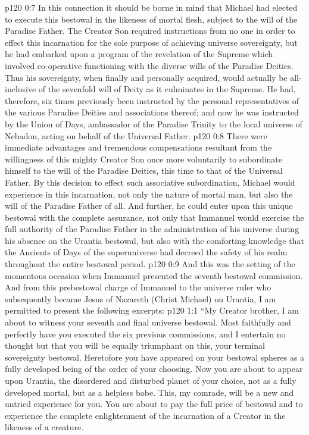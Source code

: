 \pc \vs p120 0:7 In this connection it should be borne in mind that Michael had elected to execute this bestowal in the likeness of mortal flesh, subject to the will of the Paradise Father. The Creator Son required instructions from no one in order to effect this incarnation for the sole purpose of achieving universe sovereignty, but he had embarked upon a program of the revelation of the Supreme which involved co\hyp{}operative functioning with the diverse wills of the Paradise Deities. Thus his sovereignty, when finally and personally acquired, would actually be all\hyp{}inclusive of the sevenfold will of Deity as it culminates in the Supreme. He had, therefore, six times previously been instructed by the personal representatives of the various Paradise Deities and associations thereof; and now he was instructed by the Union of Days, ambassador of the Paradise Trinity to the local universe of Nebadon, acting on behalf of the Universal Father.
\pc \vs p120 0:8 There were immediate advantages and tremendous compensations resultant from the willingness of this mighty Creator Son once more voluntarily to subordinate himself to the will of the Paradise Deities, this time to that of the Universal Father. By this decision to effect such associative subordination, Michael would experience in this incarnation, not only the nature of mortal man, but also the will of the Paradise Father of all. And further, he could enter upon this unique bestowal with the complete assurance, not only that Immanuel would exercise the full authority of the Paradise Father in the administration of his universe during his absence on the Urantia bestowal, but also with the comforting knowledge that the Ancients of Days of the superuniverse had decreed the safety of his realm throughout the entire bestowal period.
\pc \vs p120 0:9 And this was the setting of the momentous occasion when Immanuel presented the seventh bestowal commission. And from this prebestowal charge of Immanuel to the universe ruler who subsequently became Jesus of Nazareth (Christ Michael) on Urantia, I am permitted to present the following excerpts:
\vs p120 1:1 “My Creator brother, I am about to witness your seventh and final universe bestowal. Most faithfully and perfectly have you executed the six previous commissions, and I entertain no thought but that you will be equally triumphant on this, your terminal sovereignty bestowal. Heretofore you have appeared on your bestowal spheres as a fully developed being of the order of your choosing. Now you are about to appear upon Urantia, the disordered and disturbed planet of your choice, not as a fully developed mortal, but as a helpless babe. This, my comrade, will be a new and untried experience for you. You are about to pay the full price of bestowal and to experience the complete enlightenment of the incarnation of a Creator in the likeness of a creature.
